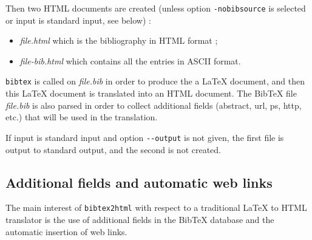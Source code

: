 \documentclass[11pt,a4paper]{article}
\begin{document}
Then two HTML documents are created (unless option
\verb|-nobibsource| is selected or input is standard input, see below) : 
\begin{itemize}
\item \textit{file.html} which is the bibliography in HTML format
;
\item \textit{file-bib.html} which contains all the entries in ASCII
  format.
\end{itemize}
\texttt{bibtex} is called on \textit{file.bib} in order to produce the
a LaTeX document, and then this LaTeX document is translated into an
HTML document.  The BibTeX file \textit{file.bib} is also parsed in
order to collect additional fields (abstract, url, ps, http, etc.)
that will be used in the translation.

If input is standard input and option \verb|--output| is not given,
the first file is output to standard output, and the second is not
created.


\subsection{Additional fields and automatic web links}

The main interest of \texttt{bibtex2html} with respect to a
traditional LaTeX to HTML translator is the use of additional fields
in the BibTeX database and the automatic insertion of web
links.
\end{document}
